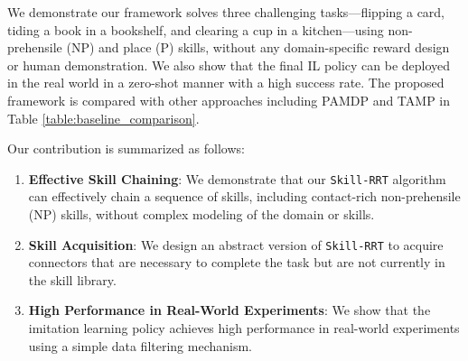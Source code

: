 We demonstrate our framework solves three challenging tasks—flipping a card, tiding a book in a bookshelf, and clearing a cup in a kitchen—using non-prehensile (NP) and place (P) skills, without any domain-specific reward design or human demonstration. We also show that the final IL policy can be deployed in the real world in a zero-shot manner with a high success rate. The proposed framework is compared with other approaches including PAMDP and TAMP in Table \ref{table:baseline_comparison}.

Our contribution is summarized as follows:
\begin{enumerate}
  \item \textbf{Effective Skill Chaining}: We demonstrate that our \texttt{Skill-RRT} algorithm can effectively chain a sequence of skills, including contact-rich non-prehensile (NP) skills, without complex modeling of the domain or skills.
  \item \textbf{Skill Acquisition}: We design an abstract version of \texttt{Skill-RRT} to acquire connectors that are necessary to complete the task but are not currently in the skill library.
  \item \textbf{High Performance in Real-World Experiments}: We show that the imitation learning policy achieves high performance in real-world experiments using a simple data filtering mechanism.
\end{enumerate}
